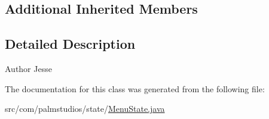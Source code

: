 \subsection*{Additional Inherited Members}


\subsection{Detailed Description}
\begin{DoxyAuthor}{Author}
Jesse 
\end{DoxyAuthor}


The documentation for this class was generated from the following file\+:\begin{DoxyCompactItemize}
\item 
src/com/palmstudios/state/\hyperlink{_menu_state_8java}{Menu\+State.\+java}\end{DoxyCompactItemize}
